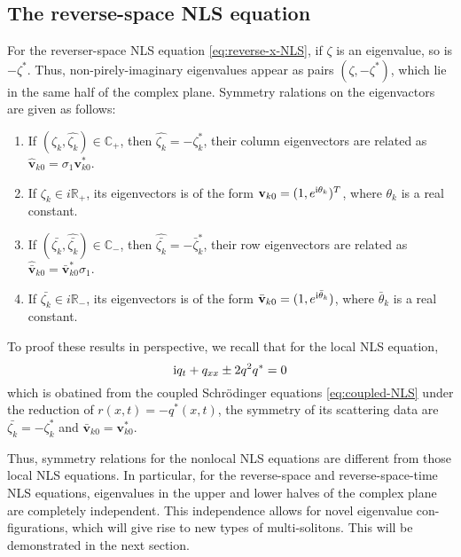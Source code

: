 \subsection{The reverse-space NLS equation}
\begin{theorem} \label{thm:NLS-inverse-x}
    For the reverser-space NLS equation \eqref{eq:reverse-x-NLS}, if $ \zeta $ is an eigenvalue, so is $ -\zeta^{*} $. Thus, non-pirely-imaginary eigenvalues appear as pairs $(\zeta, -\zeta^{*})$, which lie in the same half of the complex plane. Symmetry ralations on the eigenvactors are given as follows: 
    \begin{enumerate}
        \item If $ (\zeta_{k}, \hat{\zeta_{k}}) \in \mathbb{C_{+}}$, then $\hat{\zeta_{k}} = - \zeta^{*}_{k} $, their column eigenvectors are related as $\hat{\mathbf{v}}_{k0} = \sigma_{1} \mathbf{v}_{k0}^{*}$.
        \item If $ \zeta_{k} \in i\mathbb{R}_{+} $, its eigenvectors is of the form $\mathbf{v}_{k0} = (1, e^{\mathrm{i}\theta_{k}})^{T} $, where $ \theta_{k} $ is a real constant.
        \item If $ (\bar{\zeta_{k}}, \hat{\bar{\zeta_{k}}}) \in \mathbb{C_{-}} $, then $\hat{\bar{\zeta_{k}}} = - \bar{\zeta}^{*}_{k} $, their row eigenvectors are related as $\hat{\bar{\mathbf{v}}}_{k0} = \bar{\mathbf{v}}_{k0}^{*} \sigma_{1}$.
        \item If $ \bar{\zeta_{k}} \in i\mathbb{R}_{-} $, its eigenvectors is of the form $\bar{\mathbf{v}}_{k0} = (1 ,e^{\mathrm{i}\bar{\theta}_{k}})$, where $ \bar{\theta}_{k} $ is a real constant.
    \end{enumerate}
\end{theorem}
To proof these results in perspective, we recall that for the local NLS equation, 
\begin{equation}
    \mathrm{i} q_{t} + q_{xx} \pm 2 q^{2} q^{*} = 0 \label{eq:local-NLS}
\end{equation}
which is obatined from the coupled Schrödinger equations \eqref{eq:coupled-NLS} under the reduction of $ r(x,t) = -q^{*}(x,t) $, the symmetry of its scattering data are $ \bar{\zeta_{k}} = -\zeta^{*}_{k} $ and $\bar{\mathbf{v}}_{k0} = \mathbf{v}_{k0}^{*} $. 

Thus, symmetry relations for the nonlocal NLS equations are different from those local NLS equations.  In particular, for the reverse-space and reverse-space-time NLS equations, eigenvalues in the upper and lower halves of the complex plane are completely independent. This independence allows for novel eigenvalue con-figurations, which will give rise to new types of multi-solitons. This will be demonstrated in the next section. 

